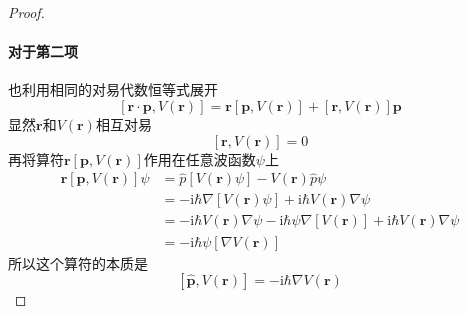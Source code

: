 \begin{proof}
    \paragraph{对于第二项} 也利用相同的对易代数恒等式展开
    $$
        \left[\boldsymbol{r}\cdot\boldsymbol{p}, V(\boldsymbol{r})\right]
        = \boldsymbol{r}\left[\boldsymbol{p}, V(\boldsymbol{r})\right] + \left[\boldsymbol{r}, V(\boldsymbol{r})\right]\boldsymbol{p}
    $$
    显然$\boldsymbol{r}$和$V(\boldsymbol{r})$相互对易
    $$
        \left[\boldsymbol{r}, V(\boldsymbol{r})\right]=0
    $$
    再将算符$\boldsymbol{r}\left[\boldsymbol{p}, V(\boldsymbol{r})\right]$作用在任意波函数$\psi$上
    $$
        \begin{aligned}
            \boldsymbol{r}\left[\boldsymbol{p}, V(\boldsymbol{r})\right]\psi
             & =\hat{p}[V(\boldsymbol{r})\psi]-V(\boldsymbol{r})\hat{p}\psi                                                                                \\
             & = -\mathrm{i}\hbar\nabla[V(\boldsymbol{r})\psi] + \mathrm{i}\hbar V(\boldsymbol{r})\nabla\psi                                               \\
             & = -\mathrm{i}\hbar V(\boldsymbol{r})\nabla\psi - \mathrm{i}\hbar\psi\nabla[V(\boldsymbol{r})] + \mathrm{i}\hbar V(\boldsymbol{r})\nabla\psi \\
             & = -\mathrm{i}\hbar\psi[\nabla V(\boldsymbol{r})]
        \end{aligned}
    $$
    所以这个算符的本质是
    $$
        \left[\hat{\boldsymbol{p}}, V(\boldsymbol{r})\right] = -\mathrm{i}\hbar\nabla{V(\boldsymbol{r})}
    $$
\end{proof}




